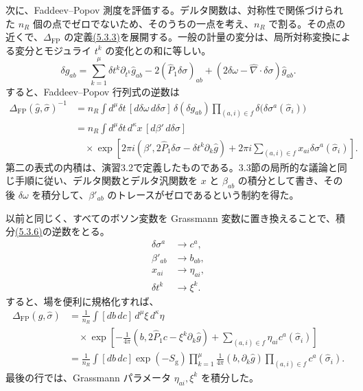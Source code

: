 次に、Faddeev--Popov 測度を評価する。デルタ関数は、対称性で関係づけられた $n_R$ 個の点でゼロでないため、そのうちの一点を考え、$n_R$ で割る。その点の近くで、$\Delta_{\mathrm{FP}}$ の定義\hyperref[eq:5.3.3]{(5.3.3)}を展開する。一般の計量の変分は、局所対称変換による変分とモジュライ $t^k$ の変化との和に等しい。
\begin{equation}
\delta g_{ab}
=\sum_{k=1}^{\mu}\delta t^k\partial_{t^k}\hat g_{ab}
-2(\hat P_1\delta\sigma)_{ab}
+(2\delta\omega-\hat\nabla\cdot\delta\sigma)\hat g_{ab}.
\tag{5.3.5}\label{eq:5.3.5}
\end{equation}
すると、Faddeev--Popov 行列式の逆数は
\begin{equation}
\begin{aligned}
\Delta_{\mathrm{FP}}(\hat g,\hat\sigma)^{-1}
&=n_R\int d^\mu\delta t\,[d\delta\omega\,d\delta\sigma]\,
\delta(\delta g_{ab})
\prod_{(a,i)\in f}\delta\bigl(\delta\sigma^a(\hat\sigma_i)\bigr)\\
&=n_R\int d^\mu\delta t\,d^\kappa x\,[d\beta'\,d\delta\sigma]\\
&\quad\times\exp\left[
2\pi i(\beta',2\hat P_1\delta\sigma-\delta t^k\partial_k\hat g)
+2\pi i\sum_{(a,i)\in f}x_{ai}\delta\sigma^a(\hat\sigma_i)
\right].
\end{aligned}
\tag{5.3.6}\label{eq:5.3.6}
\end{equation}
第二の表式の内積は、演習3.2で定義したものである。3.3節の局所的な議論と同じ手順に従い、デルタ関数とデルタ汎関数を $x$ と $\beta_{ab}$ の積分として書き、その後 $\delta\omega$ を積分して、$\beta'_{ab}$ のトレースがゼロであるという制約を得た。

以前と同じく、すべてのボソン変数を Grassmann 変数に置き換えることで、積分\hyperref[eq:5.3.6]{(5.3.6)}の逆数をとる。
\begin{align}
\delta\sigma^a&\longrightarrow c^a,
\tag{5.3.7a}\label{eq:5.3.7a}\\
\beta'_{ab}&\longrightarrow b_{ab},
\tag{5.3.7b}\label{eq:5.3.7b}\\
x_{ai}&\longrightarrow\eta_{ai},
\tag{5.3.7c}\label{eq:5.3.7c}\\
\delta t^k&\longrightarrow\xi^k.
\tag{5.3.7d}\label{eq:5.3.7d}
\end{align}
すると、場を便利に規格化すれば、
\begin{equation}
\begin{aligned}
\Delta_{\mathrm{FP}}(\hat g,\hat\sigma)
&=\frac1{n_R}\int[db\,dc]\,d^\mu\xi\,d^\kappa\eta\\
&\quad\times\exp\left[
-\frac1{4\pi}(b,2\hat P_1c-\xi^k\partial_k\hat g)
+\sum_{(a,i)\in f}\eta_{ai}c^a(\hat\sigma_i)\right]\\
&=\frac1{n_R}\int[db\,dc]\exp(-S_{\mathrm g})
\prod_{k=1}^{\mu}\frac1{4\pi}(b,\partial_k\hat g)
\prod_{(a,i)\in f}c^a(\hat\sigma_i).
\end{aligned}
\tag{5.3.8}\label{eq:5.3.8}
\end{equation}
最後の行では、Grassmann パラメータ $\eta_{ai},\xi^k$ を積分した。

